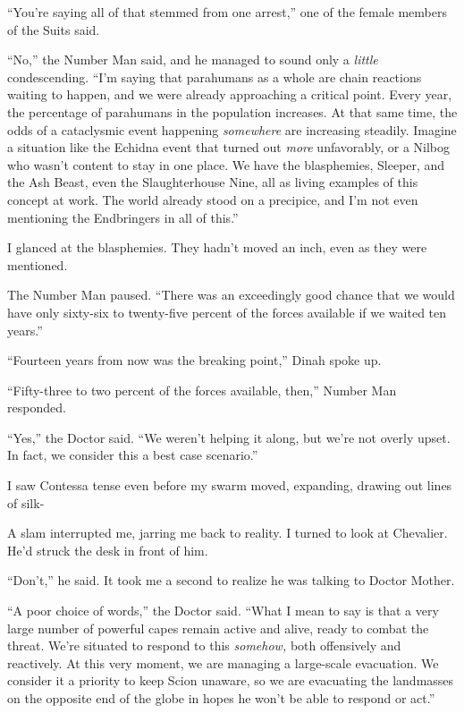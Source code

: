 ``You're saying all of that stemmed from one arrest,'' one of the female members of the Suits said.



``No,'' the Number Man said, and he managed to sound only a \emph{little} condescending.  ``I'm saying that parahumans as a whole are chain reactions waiting to happen, and we were already approaching a critical point.  Every year, the percentage of parahumans in the population increases.  At that same time, the odds of a cataclysmic event happening \emph{somewhere} are increasing steadily.  Imagine a situation like the Echidna event that turned out \emph{more} unfavorably, or a Nilbog who wasn't content to stay in one place.  We have the blasphemies, Sleeper, and the Ash Beast, even the Slaughterhouse Nine, all as living examples of this concept at work. The world already stood on a precipice, and I'm not even mentioning the Endbringers in all of this.''



I glanced at the blasphemies.  They hadn't moved an inch, even as they were mentioned.



The Number Man paused.  ``There was an exceedingly good chance that we would have only sixty-six to twenty-five percent of the forces available if we waited ten years.''



``Fourteen years from now was the breaking point,'' Dinah spoke up.



``Fifty-three to two percent of the forces available, then,'' Number Man responded.



``Yes,'' the Doctor said.  ``We weren't helping it along, but we're not overly upset.  In fact, we consider this a best case scenario.''



I saw Contessa tense even before my swarm moved, expanding, drawing out lines of silk-



A slam interrupted me, jarring me back to reality.  I turned to look at Chevalier.  He'd struck the desk in front of him.



``Don't,'' he said.  It took me a second to realize he was talking to Doctor Mother.



``A poor choice of words,'' the Doctor said.  ``What I mean to say is that a very large number of powerful capes remain active and alive, ready to combat the threat.  We're situated to respond to this \emph{somehow, }both offensively and reactively.  At this very moment, we are managing a large-scale evacuation.  We consider it a priority to keep Scion unaware, so we are evacuating the landmasses on the opposite end of the globe in hopes he won't be able to respond or act.''



